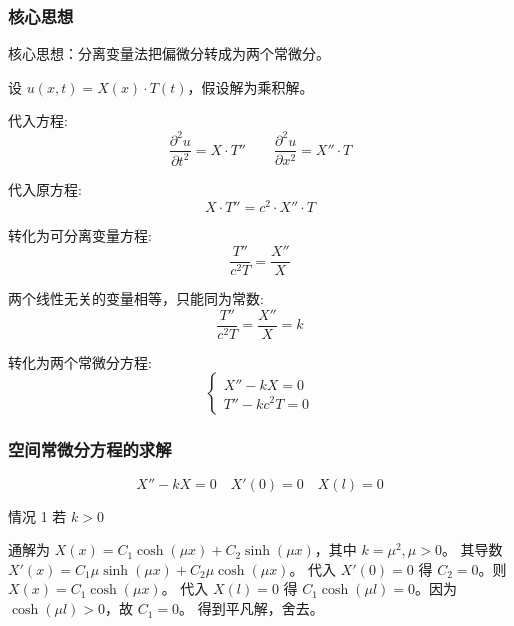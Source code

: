 \documentclass[12pt,a4paper]{article}
\numberwithin{subsection}{section}
\numberwithin{subsubsection}{subsection}
\theoremstyle{plain}
\theoremstyle{definition}
\theoremstyle{remark}
\begin{document}
	\subsubsection{核心思想}
	核心思想：分离变量法把偏微分转成为两个常微分。
	
	设 \(u(x, t) = X(x) \cdot T(t)\)，假设解为乘积解。
	
	代入方程:
	\begin{equation} \label{eq:substitution_mixed2}
		\frac{\partial^2 u}{\partial t^2} = X \cdot T'' \qquad \frac{\partial^2 u}{\partial x^2} = X'' \cdot T
	\end{equation}
	
	代入原方程:
	\begin{equation} \label{eq:original_substitution_mixed2}
		X \cdot T'' = c^2 \cdot X'' \cdot T
	\end{equation}
	
	转化为可分离变量方程:
	\begin{equation} \label{eq:separation_mixed2}
		\frac{T''}{c^2 T} = \frac{X''}{X}
	\end{equation}
	
	两个线性无关的变量相等，只能同为常数:
	\begin{equation} \label{eq:constant_mixed2}
		\frac{T''}{c^2 T} = \frac{X''}{X} = k
	\end{equation}
	
	转化为两个常微分方程:
	\begin{equation} \label{eq:ode_mixed2}
		\begin{cases}
			X'' - kX = 0 \\
			T'' - k c^2 T = 0
		\end{cases}
	\end{equation}
	
	\subsubsection{空间常微分方程的求解}
	\begin{equation}
		X'' - kX = 0 \quad X'(0) = 0 \quad X(l) = 0
	\end{equation}
	
	情况 1 \quad 若 \(k > 0\)
	
	通解为 \(X(x) = C_1 \cosh(\mu x) + C_2 \sinh(\mu x)\)，其中 \(k = \mu^2, \mu>0\)。
	其导数 $X'(x) = C_1 \mu \sinh(\mu x) + C_2 \mu \cosh(\mu x)$。
	代入 $X'(0)=0$ 得 $C_2=0$。则 $X(x) = C_1 \cosh(\mu x)$。
	代入 $X(l)=0$ 得 $C_1 \cosh(\mu l) = 0$。因为 $\cosh(\mu l)>0$，故 $C_1=0$。
	得到平凡解，舍去。
	
\end{document}
